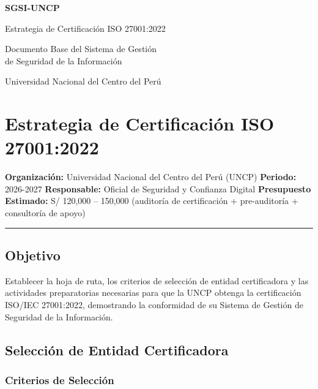 \documentclass[10pt,letterpaper]{article}
\newcommand{\makecover}{
\begin{titlepage}
\centering
\vspace*{2cm}
{\Huge\bfseries\color{uncpblue} SGSI-UNCP\par}
\vspace{0.7cm}
{\LARGE Estrategia de Certificación ISO 27001:2022\par}
\vspace{0.5cm}
{\large Documento Base del Sistema de Gestión\\de Seguridad de la Información\par}
\vspace{1.5cm}
{\small Universidad Nacional del Centro del Perú\par}
\vfill
\end{titlepage}
}
\begin{document}
\makecover
\setcounter{tocdepth}{2}
\RaggedRight
\tableofcontents
\newpage

\RaggedRight
\section{Estrategia de Certificación ISO
27001:2022}\label{estrategia-de-certificaciuxf3n-iso-270012022}

\textbf{Organización:} Universidad Nacional del Centro del Perú (UNCP)
\textbf{Periodo:} 2026-2027 \textbf{Responsable:} Oficial de Seguridad y
Confianza Digital \textbf{Presupuesto Estimado:} S/ 120,000 -- 150,000
(auditoría de certificación + pre-auditoría + consultoría de apoyo)

\begin{center}\rule{0.5\linewidth}{0.5pt}\end{center}

\subsection{Objetivo}\label{objetivo}

Establecer la hoja de ruta, los criterios de selección de entidad
certificadora y las actividades preparatorias necesarias para que la
UNCP obtenga la certificación ISO/IEC 27001:2022, demostrando la
conformidad de su Sistema de Gestión de Seguridad de la Información.

\subsection{Selección de Entidad
Certificadora}\label{selecciuxf3n-de-entidad-certificadora}

\subsubsection{Criterios de Selección}\label{criterios-de-selecciuxf3n}
\end{document}
